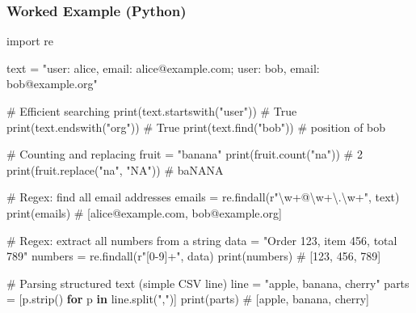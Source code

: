 \documentclass[
  letterpaper,
  DIV=11,
  numbers=noendperiod]{scrreprt}
\newenvironment{Shaded}{\begin{snugshade}}{\end{snugshade}}
\newcommand{\BuiltInTok}[1]{\textcolor[rgb]{0.00,0.23,0.31}{#1}}
\newcommand{\CharTok}[1]{\textcolor[rgb]{0.13,0.47,0.30}{#1}}
\newcommand{\CommentTok}[1]{\textcolor[rgb]{0.37,0.37,0.37}{#1}}
\newcommand{\ControlFlowTok}[1]{\textcolor[rgb]{0.00,0.23,0.31}{\textbf{#1}}}
\newcommand{\DecValTok}[1]{\textcolor[rgb]{0.68,0.00,0.00}{#1}}
\newcommand{\ImportTok}[1]{\textcolor[rgb]{0.00,0.46,0.62}{#1}}
\newcommand{\KeywordTok}[1]{\textcolor[rgb]{0.00,0.23,0.31}{\textbf{#1}}}
\newcommand{\NormalTok}[1]{\textcolor[rgb]{0.00,0.23,0.31}{#1}}
\newcommand{\OperatorTok}[1]{\textcolor[rgb]{0.37,0.37,0.37}{#1}}
\newcommand{\PreprocessorTok}[1]{\textcolor[rgb]{0.68,0.00,0.00}{#1}}
\newcommand{\StringTok}[1]{\textcolor[rgb]{0.13,0.47,0.30}{#1}}
\newcommand{\VerbatimStringTok}[1]{\textcolor[rgb]{0.13,0.47,0.30}{#1}}
\begin{document}
\subsubsection{Worked Example (Python)}\label{worked-example-python-8}

\begin{Shaded}
\begin{Highlighting}[]
\ImportTok{import}\NormalTok{ re}

\NormalTok{text }\OperatorTok{=} \StringTok{"user: alice, email: alice@example.com; user: bob, email: bob@example.org"}

\CommentTok{\# Efficient searching}
\BuiltInTok{print}\NormalTok{(text.startswith(}\StringTok{"user"}\NormalTok{))      }\CommentTok{\# True}
\BuiltInTok{print}\NormalTok{(text.endswith(}\StringTok{"org"}\NormalTok{))         }\CommentTok{\# True}
\BuiltInTok{print}\NormalTok{(text.find(}\StringTok{"bob"}\NormalTok{))             }\CommentTok{\# position of \textquotesingle{}bob\textquotesingle{}}

\CommentTok{\# Counting and replacing}
\NormalTok{fruit }\OperatorTok{=} \StringTok{"banana"}
\BuiltInTok{print}\NormalTok{(fruit.count(}\StringTok{"na"}\NormalTok{))            }\CommentTok{\# 2}
\BuiltInTok{print}\NormalTok{(fruit.replace(}\StringTok{"na"}\NormalTok{, }\StringTok{"NA"}\NormalTok{))    }\CommentTok{\# baNANA}

\CommentTok{\# Regex: find all email addresses}
\NormalTok{emails }\OperatorTok{=}\NormalTok{ re.findall(}\VerbatimStringTok{r"}\DecValTok{\textbackslash{}w}\OperatorTok{+}\VerbatimStringTok{@}\DecValTok{\textbackslash{}w}\OperatorTok{+}\CharTok{\textbackslash{}.}\DecValTok{\textbackslash{}w}\OperatorTok{+}\VerbatimStringTok{"}\NormalTok{, text)}
\BuiltInTok{print}\NormalTok{(emails)  }\CommentTok{\# [\textquotesingle{}alice@example.com\textquotesingle{}, \textquotesingle{}bob@example.org\textquotesingle{}]}

\CommentTok{\# Regex: extract all numbers from a string}
\NormalTok{data }\OperatorTok{=} \StringTok{"Order 123, item 456, total 789"}
\NormalTok{numbers }\OperatorTok{=}\NormalTok{ re.findall(}\VerbatimStringTok{r"}\PreprocessorTok{[0{-}9]}\OperatorTok{+}\VerbatimStringTok{"}\NormalTok{, data)}
\BuiltInTok{print}\NormalTok{(numbers)  }\CommentTok{\# [\textquotesingle{}123\textquotesingle{}, \textquotesingle{}456\textquotesingle{}, \textquotesingle{}789\textquotesingle{}]}

\CommentTok{\# Parsing structured text (simple CSV line)}
\NormalTok{line }\OperatorTok{=} \StringTok{"apple, banana, cherry"}
\NormalTok{parts }\OperatorTok{=}\NormalTok{ [p.strip() }\ControlFlowTok{for}\NormalTok{ p }\KeywordTok{in}\NormalTok{ line.split(}\StringTok{","}\NormalTok{)]}
\BuiltInTok{print}\NormalTok{(parts)  }\CommentTok{\# [\textquotesingle{}apple\textquotesingle{}, \textquotesingle{}banana\textquotesingle{}, \textquotesingle{}cherry\textquotesingle{}]}


\end{Highlighting}
\end{Shaded}
\end{document}
